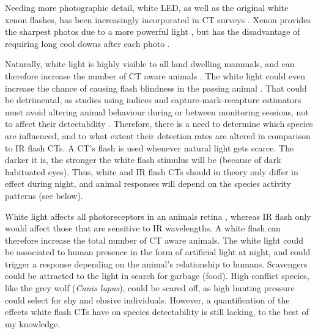 Needing more photographic detail, white LED, as well as the original white xenon flashes, has been increasingly incorporated in CT surveys \autocite{Rovero2013}.
Xenon provides the sharpest photos due to a more powerful light \cite{Rovero2013}, but has the disadvantage of requiring long cool downs after each photo \autocite{Henrich2020}.

Naturally, white light is highly visible to all land dwelling mammals, and can therefore increase the number of CT aware animals \autocite{Glen2013a,Dryja2005}. The white light could even increase the chance of causing flash blindness in the passing animal \cite{Dryja2005}.
That could be detrimental, as studies using indices and capture-mark-recapture estimators must avoid altering animal behaviour during or between monitoring sessions, not to affect their detectability \autocite{Meek2014a}.
Therefore, there is a need to determine which species are influenced, and to what extent their detection rates are altered in comparison to IR flash CTs.
A CT's flash is used whenever natural light gets scarce. 
The darker it is, the stronger the white flash stimulus will be (because of dark habituated eyes).
Thus, white and IR flash CTs should in theory only differ in effect during night, and animal responses will depend on the species activity patterns (see below). 



White light affects all photoreceptors in an animals retina \autocite{Dryja2005}, whereas IR flash only would affect those that are sensitive to IR wavelengths. 
A white flash can therefore increase the total number of CT aware animals.
The white light could be associated to human presence in the form of artificial light at night, and could trigger a response depending on the animal's relationship to humans.
Scavengers could be attracted to the light in search for garbage (food).
High conflict species, like the grey wolf (\textit{Canis lupus}), could be scared off, as high hunting pressure could select for shy and elusive individuals.
However, a quantification of the effects white flash CTs have on species detectability is still lacking, to the best of my knowledge.



